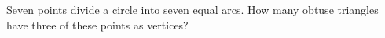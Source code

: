 Seven points divide a circle into seven equal arcs. How many obtuse triangles have three of these points as vertices?
